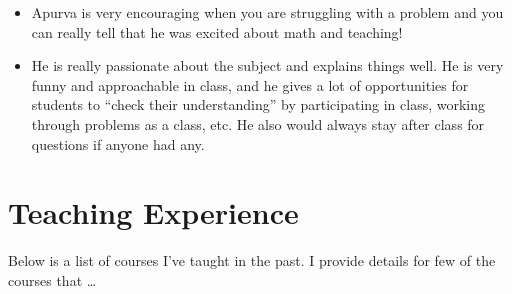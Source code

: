 \documentclass[
]{report}
\begin{document}
\begin{itemize}
  (like the other two), but there is a strong system of support from office hours and studying with MENU friends that makes the course
  doable.
\item
  Apurva is very encouraging when you are struggling with a problem and you can really tell that he was excited about math and
  teaching!\\
\item
  He is really passionate about the subject and explains things well. He is very funny and approachable in class, and he gives a lot of
  opportunities for students to ``check their understanding'' by participating in class, working through problems as a class, etc. He
  also would always stay after class for questions if anyone had any.
\end{itemize}

\hypertarget{teaching-experience}{%
\chapter{Teaching Experience}\label{teaching-experience}}

Below is a list of courses I've taught in the past. I provide details for few of the courses that \ldots{}
\end{document}
